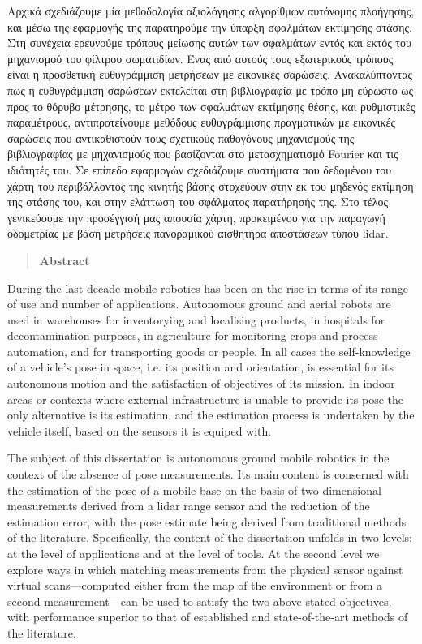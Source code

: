 Αρχικά σχεδιάζουμε μία μεθοδολογία αξιολόγησης αλγορίθμων αυτόνομης πλοήγησης,
και μέσω της εφαρμογής της παρατηρούμε την ύπαρξη σφαλμάτων εκτίμησης στάσης.
Στη συνέχεια ερευνούμε τρόπους μείωσης αυτών των σφαλμάτων εντός και εκτός του
μηχανισμού του φίλτρου σωματιδίων. Ένας από αυτούς τους εξωτερικούς τρόπους
είναι η προσθετική ευθυγράμμιση μετρήσεων με εικονικές σαρώσεις.
Ανακαλύπτοντας πως η ευθυγράμμιση σαρώσεων εκτελείται στη βιβλιογραφία με τρόπο
μη εύρωστο ως προς το θόρυβο μέτρησης, το μέτρο των σφαλμάτων εκτίμησης θέσης,
και ρυθμιστικές παραμέτρους, αντιπροτείνουμε μεθόδους ευθυγράμμισης πραγματικών
με εικονικές σαρώσεις που αντικαθιστούν τους σχετικούς παθογόνους μηχανισμούς
της βιβλιογραφίας με μηχανισμούς που βασίζονται στο μετασχηματισμό Fourier και
τις ιδιότητές του. Σε επίπεδο εφαρμογών σχεδιάζουμε συστήματα που δεδομένου
του χάρτη του περιβάλλοντος της κινητής βάσης στοχεύουν στην εκ του μηδενός
εκτίμηση της στάσης του, και στην ελάττωση του σφάλματος παρατήρησής της. Στο
τέλος γενικεύουμε την προσέγγισή μας απουσία χάρτη, προκειμένου για την
παραγωγή οδομετρίας με βάση μετρήσεις πανοραμικού αισθητήρα αποστάσεων τύπου
lidar.


\newpage

\begin{quotation}
\begin{center}
\textbf{Abstract}
\end{center}
\noindent
\end{quotation}

During the last decade mobile robotics has been on the rise in terms of its
range of use and number of applications. Autonomous ground and aerial robots
are used in warehouses for inventorying and localising products, in hospitals
for decontamination purposes, in agriculture for monitoring crops and process
automation, and for transporting goods or people. In all cases the
self-knowledge of a vehicle's pose in space, i.e. its position and orientation,
is essential for its autonomous motion and the satisfaction of objectives of
its mission. In indoor areas or contexts where external infrastructure is
unable to provide its pose the only alternative is its estimation, and the
estimation process is undertaken by the vehicle itself, based on the sensors it
is equiped with.

The subject of this dissertation is autonomous ground mobile robotics in the
context of the absence of pose measurements. Its main content is conserned with
the estimation of the pose of a mobile base on the basis of two dimensional
measurements derived from a lidar range sensor and the reduction of the
estimation error, with the pose estimate being derived from traditional methods
of the literature. Specifically, the content of the dissertation unfolds in two
levels: at the level of applications and at the level of tools. At the second
level we explore ways in which matching measurements from the physical sensor
against virtual scans---computed either from the map of the environment or from
a second measurement---can be used to satisfy the two above-stated objectives,
with performance superior to that of established and state-of-the-art methods
of the literature.

